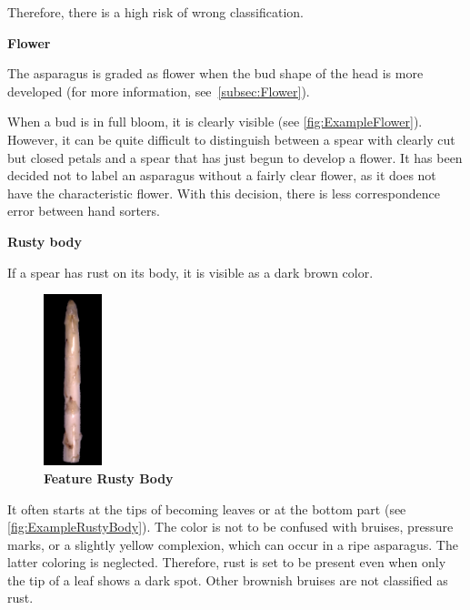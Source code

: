 Therefore, there is a high risk of wrong classification.

\bigskip
\textbf{Flower}

The asparagus is graded as flower when the bud shape of the head is more developed (for more information, see~\autoref{subsec:Flower}).

When a bud is in full bloom, it is clearly visible (see \autoref{fig:ExampleFlower}). However, it can be quite difficult to distinguish between a spear with clearly cut but closed petals and a spear that has just begun to develop a flower. It has been decided not to label an asparagus without a fairly clear flower, as it does not have the characteristic flower. With this decision, there is less correspondence error between hand sorters.

\bigskip
\textbf{Rusty body}

If a spear has rust on its body, it is visible as a dark brown color.

\begin{figure}
  \vspace{-20pt}
  \begin{center}
    \includegraphics[width=0.15\textwidth]{Figures/chapter03/example_img_rustybody.png}
  \end{center}
  \vspace{-15pt}
  \caption[Example Image Feature Rusty Body]{ \textbf{Feature Rusty Body}}
  \vspace{-40pt}
  \label{fig:ExampleRustyBody}
\end{figure}

It often starts at the tips of becoming leaves or at the bottom part (see \autoref{fig:ExampleRustyBody}). The color is not to be confused with bruises, pressure marks, or a slightly yellow complexion, which can occur in a ripe asparagus. The latter coloring is neglected.
Therefore, rust is set to be present even when only the tip of a leaf shows a dark spot. Other brownish bruises are not classified as rust.

